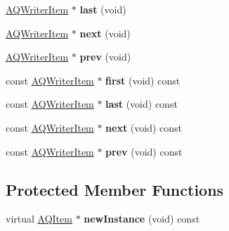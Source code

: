 \begin{DoxyCompactItemize}
\item 
\hyperlink{class_a_q_writer_item}{A\+Q\+Writer\+Item} $\ast$ {\bfseries last} (void)\hypertarget{class_a_q_writer_item_aeaa1e6bdd9019370b253029f5c09c802}{}\label{class_a_q_writer_item_aeaa1e6bdd9019370b253029f5c09c802}

\item 
\hyperlink{class_a_q_writer_item}{A\+Q\+Writer\+Item} $\ast$ {\bfseries next} (void)\hypertarget{class_a_q_writer_item_a8615aa9e620aac3ece8c2512b6c25c5c}{}\label{class_a_q_writer_item_a8615aa9e620aac3ece8c2512b6c25c5c}

\item 
\hyperlink{class_a_q_writer_item}{A\+Q\+Writer\+Item} $\ast$ {\bfseries prev} (void)\hypertarget{class_a_q_writer_item_ad8a7fb46a46fb9205e1d653502e07c7f}{}\label{class_a_q_writer_item_ad8a7fb46a46fb9205e1d653502e07c7f}

\item 
const \hyperlink{class_a_q_writer_item}{A\+Q\+Writer\+Item} $\ast$ {\bfseries first} (void) const \hypertarget{class_a_q_writer_item_a20ad481c8956678a122c39f921767440}{}\label{class_a_q_writer_item_a20ad481c8956678a122c39f921767440}

\item 
const \hyperlink{class_a_q_writer_item}{A\+Q\+Writer\+Item} $\ast$ {\bfseries last} (void) const \hypertarget{class_a_q_writer_item_a04bf2eee3c0d66319ef48afd40a48cf6}{}\label{class_a_q_writer_item_a04bf2eee3c0d66319ef48afd40a48cf6}

\item 
const \hyperlink{class_a_q_writer_item}{A\+Q\+Writer\+Item} $\ast$ {\bfseries next} (void) const \hypertarget{class_a_q_writer_item_aabc44d9a735a4feac2376d610463a89f}{}\label{class_a_q_writer_item_aabc44d9a735a4feac2376d610463a89f}

\item 
const \hyperlink{class_a_q_writer_item}{A\+Q\+Writer\+Item} $\ast$ {\bfseries prev} (void) const \hypertarget{class_a_q_writer_item_aa65e9545a8d9cdabd71abd3050bf5d6c}{}\label{class_a_q_writer_item_aa65e9545a8d9cdabd71abd3050bf5d6c}

\end{DoxyCompactItemize}
\subsection*{Protected Member Functions}
\begin{DoxyCompactItemize}
\item 
virtual \hyperlink{class_a_q_item}{A\+Q\+Item} $\ast$ {\bfseries new\+Instance} (void) const \hypertarget{class_a_q_writer_item_a1d2428ad9cb74818b1f7a4a7d9eec2be}{}\label{class_a_q_writer_item_a1d2428ad9cb74818b1f7a4a7d9eec2be}

\end{DoxyCompactItemize}
